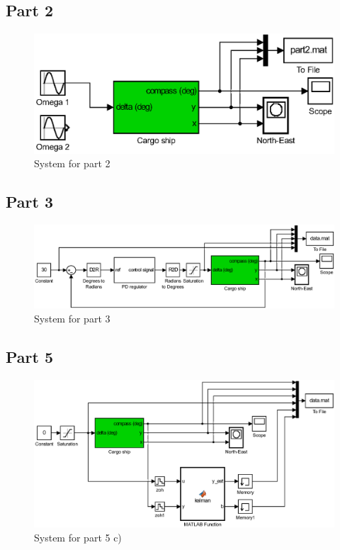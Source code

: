 \subsection{Part 2}
\begin{figure}[H]
    \begin{center}
    \includegraphics[width=1\linewidth]{Part2_pics/p5p2.eps}
    \caption{System for part 2}
    \label{sim:part2}
    \end{center}
\end{figure}

\subsection{Part 3}\label{sec:simulink_diagrams_3}
\begin{figure}[H]
    \begin{center}
    \includegraphics[width=1\linewidth]{Part3_pics/p5p3b.eps}
    \caption{System for part 3}\label{sim:part3}
    \end{center}
\end{figure}

\subsection{Part 5}
\begin{figure}[H]
    \begin{center}
    \includegraphics[width=1\linewidth]{Part5_pics/p5p5c.eps}
    \caption{System for part 5 c)}\label{sim:part5c}
    \end{center}
\end{figure}

